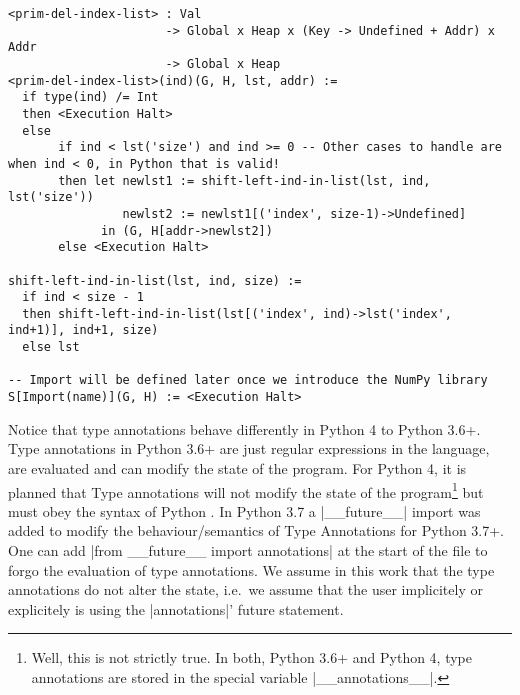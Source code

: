 \begin{verbatim}
<prim-del-index-list> : Val
                      -> Global x Heap x (Key -> Undefined + Addr) x Addr
                      -> Global x Heap
<prim-del-index-list>(ind)(G, H, lst, addr) :=
  if type(ind) /= Int
  then <Execution Halt>
  else
       if ind < lst('size') and ind >= 0 -- Other cases to handle are when ind < 0, in Python that is valid!
       then let newlst1 := shift-left-ind-in-list(lst, ind, lst('size'))
                newlst2 := newlst1[('index', size-1)->Undefined]
             in (G, H[addr->newlst2])
       else <Execution Halt>

shift-left-ind-in-list(lst, ind, size) :=
  if ind < size - 1
  then shift-left-ind-in-list(lst[('index', ind)->lst('index', ind+1)], ind+1, size)
  else lst

-- Import will be defined later once we introduce the NumPy library
S[Import(name)](G, H) := <Execution Halt>
\end{verbatim}

Notice that type annotations behave differently in Python 4 to Python
3.6+. Type annotations in Python 3.6+ are just regular expressions in
the language, are evaluated and can modify the state of the program. For
Python 4, it is planned that Type annotations will not modify the state
of the program\footnote{Well, this is not strictly true. In both, Python
  3.6+ and Python 4, type annotations are stored in the special variable
  \pycode|__annotations__|. {}} but must obey the syntax of Python {}. In Python 3.7 a \pycode|__future__| import was added to
modify the behaviour/semantics of Type Annotations for Python 3.7+. One
can add \pycode|from __future__ import annotations|
at the start of the file to forgo the evaluation of type annotations. We
assume in this work that the type annotations do not alter the state,
i.e.~we assume that the user implicitely or explicitely is using the
\pycode|annotations|' future statement.

